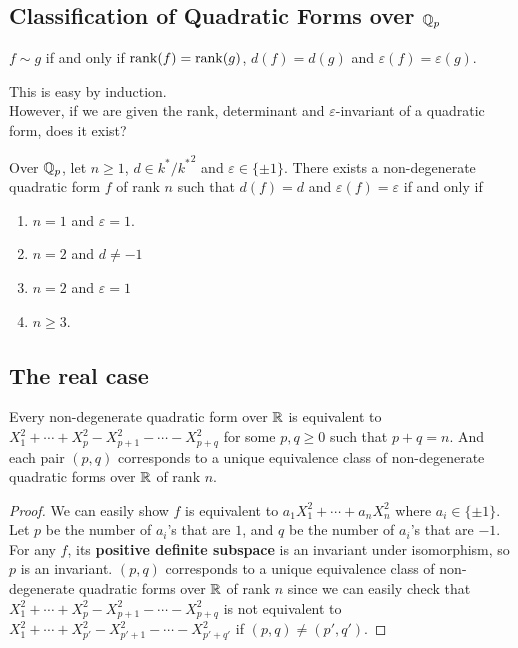 \documentclass[15pt]{scrartcl}
\begin{document}
\subsection{Classification of Quadratic Forms over $\mathbb Q_p$}
\begin{theorem}
    $f\sim g$ if and only if $\operatorname{rank}(f)=\operatorname{rank}(g)$, $d(f)=d(g)$ and $\varepsilon(f)=\varepsilon(g)$.
\end{theorem}
This is easy by induction. 
\\

However, if we are given the rank, determinant and $\varepsilon$-invariant of a quadratic form, does it exist? 
\begin{theorem}
    Over $\mathbb Q_p$, let $n\geq 1$, $d\in k^*/{k^*}^2$ and $\varepsilon\in \{\pm 1\}$. There exists a non-degenerate quadratic form $f$ of rank $n$ such that $d(f)=d$ and $\varepsilon(f)=\varepsilon$ if and only if 
    \begin{enumerate}
        \item $n=1$ and $\varepsilon=1$.
        \item $n=2$ and $d\neq -1$
        \item $n=2$ and $\varepsilon=1$
        \item $n\geq 3$. 
    \end{enumerate}
\end{theorem}
\subsection{The real case}
\begin{theorem}
    Every non-degenerate quadratic form over $\mathbb R$ is equivalent to $X_1^2+\cdots +X_p^2-X_{p+1}^2-\cdots -X_{p+q}^2$ for some $p,q\geq 0$ such that $p+q=n$. And each pair $(p,q)$ corresponds to a unique equivalence class of non-degenerate quadratic forms over $\mathbb R$ of rank $n$.
\end{theorem}
\begin{proof}
    We can easily show $f$ is equivalent to $a_1X_1^2+\cdots +a_nX_n^2$ where $a_i\in \{\pm 1\}$. Let $p$ be the number of $a_i$'s that are $1$, and $q$ be the number of $a_i$'s that are $-1$. For any $f$, its \textbf{positive definite subspace} is an invariant under isomorphism, so $p$ is an invariant. $(p,q)$ corresponds to a unique equivalence class of non-degenerate quadratic forms over $\mathbb R$ of rank $n$ since we can easily check that $X_1^2+\cdots +X_p^2-X_{p+1}^2-\cdots -X_{p+q}^2$ is not equivalent to $X_1^2+\cdots +X_{p'}^2-X_{p'+1}^2-\cdots -X_{p'+q'}^2$ if $(p,q)\neq (p',q')$.
\end{proof}
\end{document}
